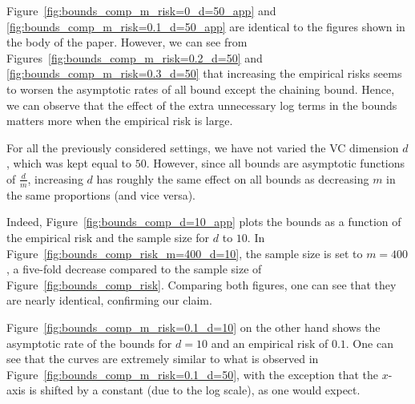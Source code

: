\documentclass[twoside,11pt]{article}
\renewcommand{\O}{\mathscr{O}}
\begin{document}
Figure~\ref{fig:bounds_comp_m_risk=0_d=50_app} and \ref{fig:bounds_comp_m_risk=0.1_d=50_app} are identical to the figures shown in the body of the paper.
However, we can see from Figures~\ref{fig:bounds_comp_m_risk=0.2_d=50} and \ref{fig:bounds_comp_m_risk=0.3_d=50} that increasing the empirical risks seems to worsen the asymptotic rates of all bound except the chaining bound.
Hence, we can observe that the effect of the extra unnecessary log terms in the bounds matters more when the empirical risk is large.

For all the previously considered settings, we have not varied the VC dimension $d$, which was kept equal to $50$.
However, since all bounds are asymptotic functions of $\frac{d}{m}$, increasing $d$ has roughly the same effect on all bounds as decreasing $m$ in the same proportions (and vice versa).

Indeed, Figure~\ref{fig:bounds_comp_d=10_app} plots the bounds as a function of the empirical risk and the sample size for $d$ to $10$.
In Figure~\ref{fig:bounds_comp_risk_m=400_d=10}, the sample size is set to $m=400$, a five-fold decrease compared to the sample size of Figure~\ref{fig:bounds_comp_risk}.
Comparing both figures, one can see that they are nearly identical, confirming our claim.

Figure~\ref{fig:bounds_comp_m_risk=0.1_d=10} on the other hand shows the asymptotic rate of the bounds for $d=10$ and an empirical risk of $0.1$.
One can see that the curves are extremely similar to what is observed in Figure~\ref{fig:bounds_comp_m_risk=0.1_d=50}, with the exception that the $x$-axis is shifted by a constant (due to the log scale), as one would expect.
\end{document}
